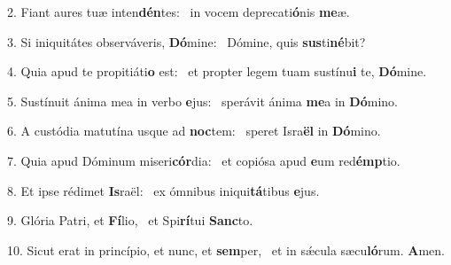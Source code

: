 2. Fiant aures tuæ inten\textbf{dén}tes: \ast\  in vocem deprecati\textbf{ó}nis \textbf{me}æ.\

3. Si iniquitátes observáveris, \textbf{Dó}mine: \ast\  Dómine, quis \textbf{sus}ti\textbf{né}bit?\

4. Quia apud te propitiáti\textbf{o} est: \ast\  et propter legem tuam sustínu\textbf{i} te, \textbf{Dó}mine.\

5. Sustínuit ánima mea in verbo \textbf{e}jus: \ast\  sperávit ánima \textbf{me}a in \textbf{Dó}mino.\

6. A custódia matutína usque ad \textbf{noc}tem: \ast\  speret Isra\textbf{ël} in \textbf{Dó}mino.\

7. Quia apud Dóminum miseri\textbf{cór}dia: \ast\  et copiósa apud \textbf{e}um red\textbf{émp}tio.\

8. Et ipse rédimet \textbf{Is}raël: \ast\  ex ómnibus iniqui\textbf{tá}tibus \textbf{e}jus.\

9. Glória Patri, et \textbf{Fí}lio, \ast\  et Spi\textbf{rí}tui \textbf{Sanc}to.\

10. Sicut erat in princípio, et nunc, et \textbf{sem}per, \ast\  et in sǽcula sæcu\textbf{ló}rum. \textbf{A}men.\

